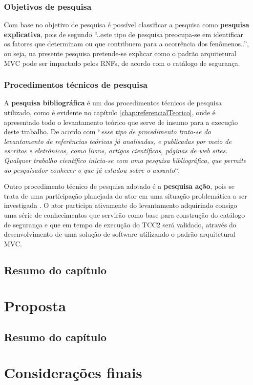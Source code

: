\subsection{Objetivos de pesquisa}

Com base no objetivo de pesquisa é possível classificar a pesquisa como \textbf{pesquisa explicativa}, pois de segundo \cite{gil2002elaborar} “..este tipo de pesquisa preocupa-se em identificar os fatores que determinam ou que contribuem para a ocorrência dos fenômenos..”, ou seja, na presente pesquisa pretende-se explicar como o padrão arquitetural MVC pode ser impactado pelos RNFs, de acordo com o catálogo de segurança.

\subsection{Procedimentos técnicos de pesquisa}

A \textbf{pesquisa bibliográfica} é um dos procedimentos técnicos de pesquisa utilizado, como é evidente no capítulo \ref{chap:referencialTeorico}, onde é apresentado todo o levantamento teórico que serve de insumo para a execução deste trabalho. De acordo com \cite[p.35]{fonseca2002metodologia} “\textit{esse tipo de procedimento trata-se do levantamento de referências teóricas já analisadas, e publicadas por meio de escritos e eletrônicos, como livros, artigos científicos, páginas de web sites. Qualquer trabalho científico inicia-se com uma pesquisa bibliográfica, que permite ao pesquisador conhecer o que já estudou sobre o assunto}“.
 
Outro procedimento técnico de pesquisa adotado é a \textbf{pesquisa ação}, pois se trata de uma participação planejada do ator em uma situação problemática a ser investigada \cite{fonseca2002metodologia}. O ator participa ativamente do levantamento adquirindo consigo uma série de conhecimentos que servirão como base para construção do catálogo de segurança e que em tempo de execução do TCC2 será validado, através do desenvolvimento de uma solução de software utilizando o padrão arquitetural MVC. 


\section{Resumo do capítulo}

\chapter{Proposta}
\label{chap:proposta}

\section{Resumo do capítulo}

\chapter{Considerações finais}